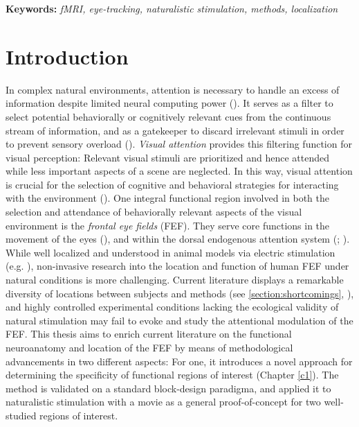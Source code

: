 \documentclass[a4paper, 12pt]{scrreprt}
\begin{document}
\bigskip

\textbf{Keywords:} \textit{fMRI, eye-tracking, naturalistic stimulation, methods, localization}



\chapter{Introduction}\label{section:intro}

In complex natural environments, attention is necessary to handle an excess of information despite limited neural computing power (\cite{carrasco2011visual}). It serves as a filter to select potential behaviorally or cognitively relevant cues from the continuous stream of information, and as a gatekeeper to discard irrelevant stimuli in order to prevent sensory overload (\cite{bellebaum2012neuropsych}). \textit{Visual attention} provides this filtering function for visual perception: Relevant visual stimuli are prioritized and hence attended while less important aspects of a scene are neglected. In this way, visual attention is crucial for the selection of cognitive and behavioral strategies for interacting with the environment (\cite{siegelbaum2000neuro}).\newline
One integral functional region involved in both the selection and attendance of behaviorally relevant aspects of the visual environment is the \textit{frontal eye fields} (FEF). They serve core functions in the movement of the eyes (\cite{krauzlis2014eye}), and within the dorsal endogenous attention system (\cite{corbetta2002control}; \cite{corbetta2008reorienting}). While well localized and understood in animal models via electric stimulation (e.g. \cite{bruce1985primate}), non-invasive research into the location and function of human FEF under natural conditions is more challenging. Current literature displays a remarkable diversity of locations between subjects and methods (see \ref{section:shortcomings}, \cite{vernet2014corrigendum}), and highly controlled experimental conditions lacking the ecological validity of natural stimulation may fail to evoke and study the attentional modulation of the FEF. \newline
This thesis aims to enrich current literature on the functional neuroanatomy and location of the FEF by means of methodological advancements in two different aspects: For one, it introduces a novel approach for determining the specificity of functional regions of interest (Chapter \ref{c1}). The method is validated on a standard block-design paradigma, and applied it to naturalistic stimulation with a movie as a general proof-of-concept for two well-studied regions of interest.
\end{document}
